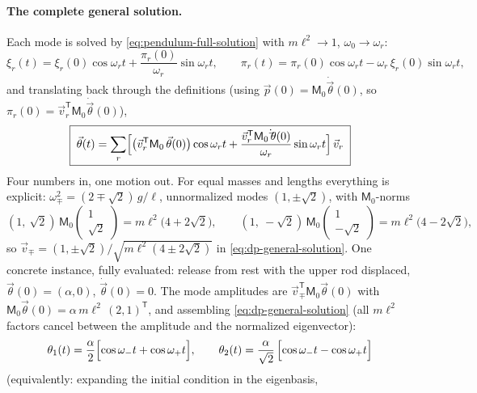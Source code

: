 \documentclass[11pt]{article}
\theoremstyle{plain}
\theoremstyle{definition}
\theoremstyle{remark}
\newcommand{\vp}{\vec{p}}
\newcommand{\vth}{\vec{\theta}}
\newcommand{\mM}{\mathsf{M}}
\begin{document}
\paragraph{The complete general solution.}
Each mode is solved by \eqref{eq:pendulum-full-solution} with
$m\ell^2 \to 1$, $\omega_0 \to \omega_r$:
\begin{equation}
  \xi_r(t) = \xi_r(0)\cos\omega_r t
  + \frac{\pi_r(0)}{\omega_r}\sin\omega_r t ,
  \qquad
  \pi_r(t) = \pi_r(0)\cos\omega_r t - \omega_r\,\xi_r(0)\sin\omega_r t ,
\end{equation}
and translating back through the definitions (using
$\vp(0) = \mM_0\dot\vth(0)$, so $\pi_r(0) = \vec
v_r^{\mathsf T}\mM_0\dot\vth(0)$),
\begin{equation}
  \boxed{\;
  \vth(t) = \sum_{r}
  \Bigl[\bigl(\vec v_r^{\mathsf T}\mM_0\,\vth(0)\bigr)\cos\omega_r t
  + \frac{\vec v_r^{\mathsf T}\mM_0\,\dot\vth(0)}{\omega_r}
  \sin\omega_r t\Bigr]\,\vec v_r
  \;}
  \label{eq:dp-general-solution}
\end{equation}
Four numbers in, one motion out. For equal
masses and lengths everything is explicit:
$\omega_\mp^2 = (2\mp\sqrt2)\,g/\ell$, unnormalized modes
$(1, \pm\sqrt2)$, with $\mM_0$-norms
\begin{equation}
  (1,\ \sqrt2)\,\mM_0\begin{pmatrix}1\\ \sqrt2\end{pmatrix}
  = m\ell^2\bigl(4 + 2\sqrt2\bigr),
  \qquad
  (1,\ -\sqrt2)\,\mM_0\begin{pmatrix}1\\ -\sqrt2\end{pmatrix}
  = m\ell^2\bigl(4 - 2\sqrt2\bigr),
\end{equation}
so $\vec v_\mp = (1, \pm\sqrt2)\big/\sqrt{m\ell^2(4\pm2\sqrt2)}$ in
\eqref{eq:dp-general-solution}. One concrete instance, fully evaluated:
release from rest with the upper rod displaced, $\vth(0) = (\alpha, 0)$,
$\dot\vth(0) = 0$. The mode amplitudes are
$\vec v_\mp^{\mathsf T}\mM_0\vth(0)$ with
$\mM_0\vth(0) = \alpha\,m\ell^2\,(2, 1)^{\mathsf T}$, and assembling
\eqref{eq:dp-general-solution} (all $m\ell^2$ factors cancel between the
amplitude and the normalized eigenvector):
\begin{equation}
  \theta_1(t) = \frac{\alpha}{2}\Bigl[
  \cos\omega_- t + \cos\omega_+ t\Bigr],
  \qquad
  \theta_2(t) = \frac{\alpha}{\sqrt2}\,\Bigl[
  \cos\omega_- t - \cos\omega_+ t\Bigr]
  \label{eq:dp-concrete}
\end{equation}
(equivalently: expanding the initial condition in the eigenbasis,
\end{document}
